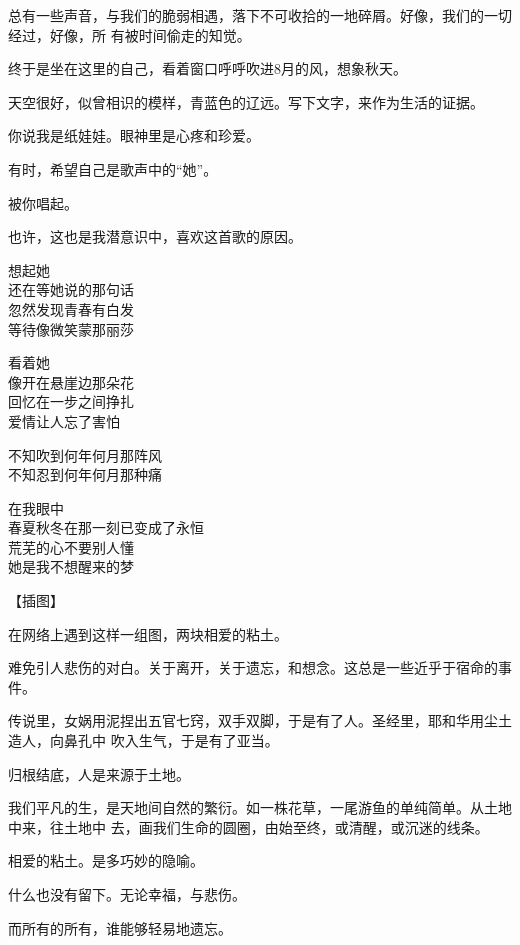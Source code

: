		总有一些声音，与我们的脆弱相遇，落下不可收拾的一地碎屑。好像，我们的一切经过，好像，所
	有被时间偷走的知觉。


		终于是坐在这里的自己，看着窗口呼呼吹进8月的风，想象秋天。

		天空很好，似曾相识的模样，青蓝色的辽远。写下文字，来作为生活的证据。


		你说我是纸娃娃。眼神里是心疼和珍爱。

		有时，希望自己是歌声中的“她”。

		被你唱起。

		也许，这也是我潜意识中，喜欢这首歌的原因。

		\longpoem{}{}{}
			想起她 \\
			还在等她说的那句话 \\
			忽然发现青春有白发 \\
			等待像微笑蒙那丽莎

			看着她 \\
			像开在悬崖边那朵花 \\
			回忆在一步之间挣扎 \\
			爱情让人忘了害怕

			不知吹到何年何月那阵风 \\
			不知忍到何年何月那种痛

			在我眼中 \\
			春夏秋冬在那一刻已变成了永恒 \\
			荒芜的心不要别人懂 \\
			她是我不想醒来的梦
		\endlongpoem

	\endwriting




		【插图】

		在网络上遇到这样一组图，两块相爱的粘土。

		难免引人悲伤的对白。关于离开，关于遗忘，和想念。这总是一些近乎于宿命的事件。

		传说里，女娲用泥捏出五官七窍，双手双脚，于是有了人。圣经里，耶和华用尘土造人，向鼻孔中
	吹入生气，于是有了亚当。

		归根结底，人是来源于土地。

		我们平凡的生，是天地间自然的繁衍。如一株花草，一尾游鱼的单纯简单。从土地中来，往土地中
	去，画我们生命的圆圈，由始至终，或清醒，或沉迷的线条。

		相爱的粘土。是多巧妙的隐喻。


		什么也没有留下。无论幸福，与悲伤。

		而所有的所有，谁能够轻易地遗忘。

